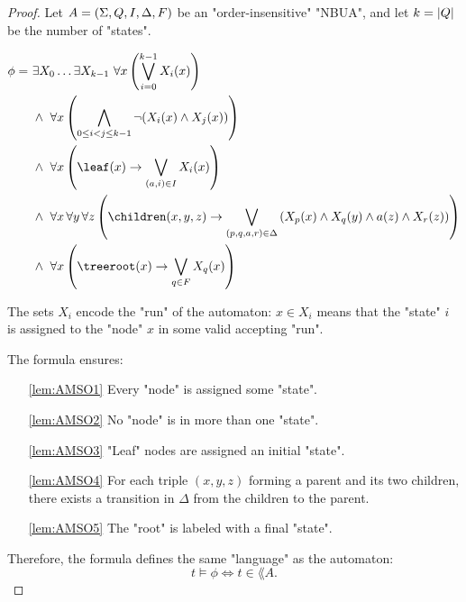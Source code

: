 \documentclass[a4paper,UKenglish,cleveref, autoref, thm-restate]{lipics-v2021}
\begin{document}
\begin{proof}\label{lem:Aut-to-MSO}
	Let $A = (\Sigma, Q, I, \Delta, F)$ be an "order-insensitive" "NBUA", and let $k = \left|Q\right|$ be the number of "states".

	\begin{align}
		\phi =\  & \exists X_0 \ldots \exists X_{k-1} \ \forall x \left( \bigvee_{i=0}^{k-1} X_i(x) \right) \label{lem:AMSO1}                                                                                    \\
		         & \land\ \forall x \left( \bigwedge_{0 \leq i < j \leq k-1} \lnot (X_i(x) \land X_j(x)) \right) \label{lem:AMSO2}                                                                               \\
		         & \land\ \forall x \left( \leaf(x) \rightarrow \bigvee_{(a,i) \in I} X_i(x) \right) \label{lem:AMSO3}                                                                                           \\
		         & \land\ \forall x\, \forall y\, \forall z \left(\children(x,y,z) \rightarrow \bigvee_{(p,q,a,r) \in \Delta} \left(X_p(x) \land X_q(y) \land a(z) \land X_r(z)\right) \right) \label{lem:AMSO4} \\
		         & \land\ \forall x \left( \treeroot(x) \rightarrow \bigvee_{q \in F} X_q(x) \right) \label{lem:AMSO5}
	\end{align}

	The sets $X_i$ encode the "run" of the automaton: $x \in X_i$ means that the "state" $i$ is assigned to the "node" $x$ in some valid accepting "run".

	The formula ensures:

	\begin{itemize}
		\item[\ref{lem:AMSO1}] Every "node" is assigned some "state".
		\item[\ref{lem:AMSO2}] No "node" is in more than one "state".
		\item[\ref{lem:AMSO3}] "Leaf" nodes are assigned an initial "state".
		\item[\ref{lem:AMSO4}] For each triple $(x,y,z)$ forming a parent and its two children,
            there exists a transition in $\Delta$ from the children to the parent.
		\item[\ref{lem:AMSO5}] The "root" is labeled with a final "state".
	\end{itemize}

	Therefore, the formula defines the same "language" as the automaton:
	\[
		t \models \phi \iff t \in \lang A.
	\]
\end{proof}
\end{document}
